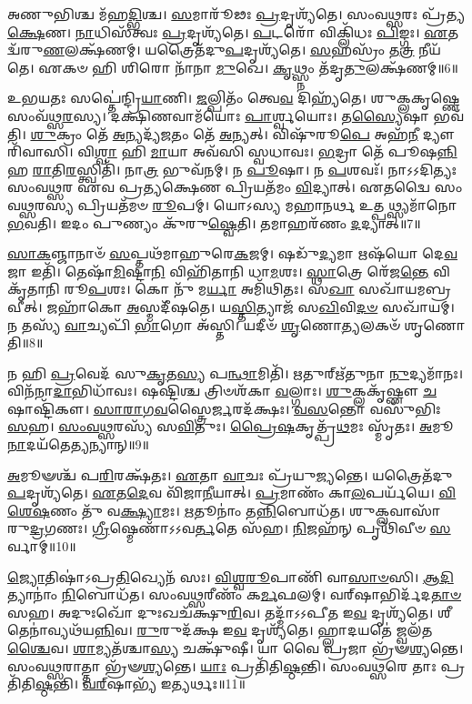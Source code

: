 𑌅𑌣𑍁𑌭𑌿𑌶𑍍𑌚 𑌮᳴𑌹\-\ul{𑌦𑍍𑌭𑌿}\-𑌶𑍍𑌚। \ul{𑌸}\-𑌮𑌾𑌰𑍂᳴𑌢𑌃 \ul{𑌪𑍍𑌰}\-𑌦𑍃𑌶𑍍𑌯᳴𑌤𑍇। 
𑌸𑌂𑌵𑌥𑍍𑌸𑌰𑌃 𑌪𑍍𑌰᳴𑌤𑍍𑌯\-\ul{𑌕𑍍𑌷𑍇}\-𑌣। \ul{𑌨𑌾}\-𑌧𑌿𑌸᳴𑌤𑍍𑌵𑌃 \ul{𑌪𑍍𑌰}\-𑌦𑍃𑌶𑍍𑌯᳴𑌤𑍇। 
\-\ul{𑌪}\-𑌟𑌰𑍋᳴ 𑌵𑌿𑌕𑍍𑌲𑌿᳴𑌧𑌃 \ul{𑌪𑌿}\-𑌙𑍍𑌗𑌃। \ul{𑌏}\-𑌤𑌦𑍍𑌵᳴𑌰𑍁\-\ul{𑌣}\-𑌲𑌕𑍍𑌷᳴𑌣𑌮𑍍। 
𑌯𑌤𑍍𑌰𑍈𑌤᳴𑌦𑍁\-\ul{𑌪}\-𑌦𑍃𑌶𑍍𑌯᳴𑌤𑍇। \ul{𑌸}\-𑌹𑌸𑍍𑌰𑌂᳴ 𑌤\-\ul{𑌤𑍍𑌰} 𑌨𑍀𑌯᳴𑌤𑍇। 
𑌏𑌕𑍞 𑌹𑌿 𑌶𑌿𑌰𑍋 𑌨𑌾᳴𑌨𑌾 \ul{𑌮𑍁}\-𑌖𑍇। \ul{𑌕𑍃}\-𑌥𑍍𑌸𑍍𑌨𑌂 𑌤᳴𑌦𑍃\-\ul{𑌤𑍁}\-𑌲𑌕𑍍𑌷᳴𑌣𑌮𑍍॥6॥

𑌉𑌭𑌯𑌤𑌃 𑌸𑌪𑍍𑌤𑍇॑𑌨𑍍𑌦𑍍𑌰𑌿\-\ul{𑌯𑌾}\-𑌣𑌿। \ul{𑌜}\-𑌲𑍍𑌪𑌿𑌤𑌂᳴ 𑌤𑍍𑌵𑍇\-\ul{𑌵} 𑌦𑌿𑌹𑍍𑌯᳴𑌤𑍇। 
𑌶𑍁𑌕𑍍𑌲𑌕𑍃𑌷𑍍𑌣𑍇 𑌸𑌂𑌵᳴𑌥𑍍𑌸\-\ul{𑌰}\-𑌸𑍍𑌯। 𑌦𑌕𑍍𑌷𑌿𑌣𑌵𑌾𑌮᳴𑌯𑍋𑌃 \ul{𑌪𑌾}\-𑌰𑍍𑌶𑍍𑌵𑌯𑍋𑌃। 
𑌤\-\ul{𑌸𑍍𑌯𑍈}\-𑌷𑌾 𑌭𑌵᳴𑌤𑌿। \ul{𑌶𑍁}\-𑌕𑍍𑌰𑌂 𑌤𑍇᳴ \ul{𑌅}\-𑌨𑍍𑌯𑌦𑍍𑌯᳴\-\ul{𑌜}\-𑌤𑌂 𑌤𑍇᳴ \ul{𑌅}\-𑌨𑍍𑌯𑌤𑍍। 
𑌵𑌿𑌷𑍁᳴𑌰𑍂\-\ul{𑌪𑍇} 𑌅𑌹᳴\-\ul{𑌨𑍀} 𑌦𑍍𑌯𑍗𑌰𑌿᳴𑌵𑌾𑌸𑌿। 𑌵𑌿\-\ul{𑌶𑍍𑌵𑌾} 𑌹𑌿 \ul{𑌮𑌾}\-𑌯𑌾 𑌅𑌵᳴𑌸𑌿 𑌸𑍍𑌵𑌧𑌾𑌵𑌃। 
\-\ul{𑌭}\-𑌦𑍍𑌰𑌾 𑌤𑍇᳴ 𑌪𑍂𑌷\-\ul{𑌨𑍍𑌨𑌿}\-𑌹 \ul{𑌰𑌾}\-𑌤𑌿\-\ul{𑌰}\-𑌸𑍍𑌤𑍍𑌵𑌿𑌤𑌿᳴। 𑌨𑌾\-\ul{𑌤𑍍𑌰} 𑌭𑍁𑌵᳴𑌨𑌮𑍍। 𑌨 \ul{𑌪𑍂}\-𑌷𑌾। 
𑌨 \ul{𑌪}\-𑌶𑌵𑌃᳴। 𑌨𑌾𑌽𑌽𑌦𑌿𑌤𑍍𑌯𑌃 𑌸𑌂𑌵𑌥𑍍𑌸𑌰 𑌏𑌵 𑌪𑍍𑌰𑌤𑍍𑌯𑌕𑍍𑌷𑍇𑌣 𑌪𑍍𑌰𑌿𑌯𑌤᳴𑌮𑌂 \ul{𑌵𑌿}\-𑌦𑍍𑌯𑌾𑌤𑍍। 
𑌏𑌤𑌦𑍍𑌵𑍈 𑌸𑌂𑌵𑌥𑍍𑌸𑌰𑌸𑍍𑌯 𑌪𑍍𑌰𑌿𑌯𑌤᳴𑌮𑍞 \ul{𑌰𑍂}\-𑌪𑌮𑍍। 𑌯𑍋𑌽𑌸𑍍𑌯 𑌮𑌹𑌾𑌨𑌰𑍍𑌥 𑌉𑌤𑍍𑌪𑌥𑍍𑌸𑍍𑌯𑌮𑌾᳴𑌨𑍋 \ul{𑌭}\-𑌵𑌤𑌿। 
𑌇𑌦𑌂 𑌪𑍁𑌣𑍍𑌯𑌂 𑌕𑍁᳴𑌰𑍁\-\ul{𑌷𑍍𑌵𑍇}\-𑌤𑌿। 𑌤𑌮𑌾𑌹𑌰᳴𑌣𑌂 \ul{𑌦}\-𑌦𑍍𑌯𑌾𑌤𑍍॥7॥\anuvakamend


\-\ul{𑌸𑌾}\-\-\ul{𑌕}\-𑌞𑍍𑌜𑌾𑌨𑌾𑍞᳴ \ul{𑌸}\-𑌪𑍍𑌤𑌥᳴𑌮𑌾𑌹𑍁𑌰𑍇\-\ul{𑌕}\-𑌜𑌮𑍍। 𑌷𑌡𑍁᳴\-\ul{𑌦𑍍𑌯}\-𑌮𑌾 𑌋𑌷᳴𑌯𑍋 𑌦𑍇\-\ul{𑌵}\-𑌜𑌾 𑌇𑌤𑌿᳴। 
𑌤𑍇𑌷𑌾᳴\-\ul{𑌮𑌿}\-𑌷𑍍𑌟𑌾\-\ul{𑌨𑌿} 𑌵𑌿𑌹𑌿᳴𑌤𑌾𑌨𑌿 𑌧𑌾\-\ul{𑌮}\-𑌶𑌃। \ul{𑌸𑍍𑌥𑌾}\-𑌤𑍍𑌰𑍇 𑌰𑍇᳴𑌜\-\ul{𑌨𑍍𑌤𑍇} 𑌵𑌿𑌕𑍃᳴𑌤𑌾𑌨𑌿 𑌰𑍂\-\ul{𑌪}\-𑌶𑌃। 
𑌕𑍋 𑌨𑍁᳴ 𑌮\-\ul{𑌰𑍍𑌯𑌾} 𑌅𑌮𑌿᳴𑌥𑌿𑌤𑌃। 𑌸\-\ul{𑌖𑌾} 𑌸𑌖𑌾᳴𑌯𑌮𑌬𑍍𑌰𑌵𑍀𑌤𑍍। 
𑌜𑌹𑌾᳴𑌕𑍋 \ul{𑌅}\-𑌸𑍍𑌮𑌦𑍀᳴𑌷𑌤𑍇। 𑌯\-\ul{𑌸𑍍𑌤𑌿}\-𑌤𑍍𑌯𑌾𑌜᳴ 𑌸\-\ul{𑌖𑌿}\-𑌵𑌿\-\ul{𑌦}\-\-\ul{𑍞} 𑌸𑌖𑌾᳴𑌯𑌮𑍍। 
𑌨 𑌤𑌸𑍍𑌯᳴ \ul{𑌵𑌾}\-𑌚𑍍𑌯𑌪𑌿᳴ \ul{𑌭𑌾}\-𑌗𑍋 𑌅᳴𑌸𑍍𑌤𑌿। 𑌯𑌦𑍀𑍞᳴ \ul{𑌶𑍃}\-𑌣𑍋\-\ul{𑌤𑍍𑌯}\-𑌲𑌕𑍞᳴ 𑌶𑍃𑌣𑍋𑌤𑌿॥8॥

𑌨 𑌹𑌿 \ul{𑌪𑍍𑌰}\-𑌵𑍇𑌦᳴ 𑌸𑍁\-\ul{𑌕𑍃}\-𑌤\-\ul{𑌸𑍍𑌯} 𑌪\-\ul{𑌨𑍍𑌥𑌾}\-𑌮𑌿𑌤𑌿᳴। \ul{𑌋}\-𑌤𑍁𑌰𑍍‌𑌋᳴𑌤𑍁𑌨𑌾 \ul{𑌨𑍁}\-𑌦𑍍𑌯𑌮𑌾᳴𑌨𑌃। 
𑌵𑌿𑌨᳴𑌨𑌾\-\ul{𑌦𑌾}\-𑌭𑌿𑌧𑌾᳴𑌵𑌃। 𑌷𑌷𑍍𑌟𑌿𑌶𑍍𑌚 𑌤𑍍𑌰𑌿𑍞𑌶᳴𑌕𑌾 \ul{𑌵}\-𑌲𑍍𑌗𑌾𑌃। 
\-\ul{𑌶𑍁}\-𑌕𑍍𑌲𑌕𑍃᳴𑌷𑍍𑌣𑍗 \ul{𑌚} 𑌷𑌾𑌷𑍍𑌟𑌿᳴𑌕𑍗। \ul{𑌸𑌾}\-\-\ul{𑌰𑌾}\-\-\ul{𑌗}\-\-\ul{𑌵}\-𑌸𑍍𑌤𑍍𑌰𑍈\-\ul{𑌰𑍍𑌜}\-𑌰𑌦᳴𑌕𑍍𑌷𑌃। 
\-\ul{𑌵}\-\-\ul{𑌸}\-𑌨𑍍𑌤𑍋 𑌵𑌸𑍁᳴𑌭𑌿𑌃 \ul{𑌸}\-𑌹। \ul{𑌸𑌂}\-\-\ul{𑌵}\-\-\ul{𑌥𑍍𑌸}\-𑌰𑌸𑍍𑌯᳴ 𑌸\-\ul{𑌵𑌿}\-𑌤𑍁𑌃। 
\-\ul{𑌪𑍍𑌰𑍈}\-\-\ul{𑌷}\-𑌕𑍃𑌤𑍍𑌪𑍍𑌰᳴\-\ul{𑌥}\-𑌮𑌃 𑌸𑍍𑌮𑍃᳴𑌤𑌃। \ul{𑌅}\-𑌮𑍂\-\ul{𑌨𑌾}\-𑌦𑌯᳴𑌤𑍇\-\ul{𑌤𑍍𑌯}\-𑌨𑍍𑌯𑌾𑌨𑍍॥9॥

\-\ul{𑌅}\-𑌮𑍂𑍟𑌶𑍍𑌚᳴ 𑌪\-\ul{𑌰𑌿}\-𑌰𑌕𑍍𑌷᳴𑌤𑌃। \ul{𑌏}\-𑌤𑌾 \ul{𑌵𑌾}\-𑌚𑌃 𑌪𑍍𑌰᳴𑌯𑍁\-\ul{𑌜𑍍𑌯}\-𑌨𑍍𑌤𑍇। 
𑌯𑌤𑍍𑌰𑍈𑌤᳴𑌦𑍁\-\ul{𑌪}\-𑌦𑍃𑌶𑍍𑌯᳴𑌤𑍇। \ul{𑌏}\-𑌤\-\ul{𑌦𑍇}\-𑌵 𑌵𑌿᳴𑌜𑌾\-\ul{𑌨𑍀}\-𑌯𑌾𑌤𑍍। 
\-\ul{𑌪𑍍𑌰}\-𑌮𑌾𑌣𑌂᳴ 𑌕𑌾\-\ul{𑌲}\-𑌪𑌰𑍍𑌯᳴𑌯𑍇। \ul{𑌵𑌿}\-\-\ul{𑌶𑍇}\-\-\ul{𑌷}\-𑌣𑌂 𑌤𑍁᳴ 𑌵\-\ul{𑌕𑍍𑌷𑍍𑌯𑌾}\-𑌮𑌃। 
\-\ul{𑌋}\-𑌤𑍂𑌨𑌾𑌂॑ 𑌤\-\ul{𑌨𑍍𑌨𑌿}\-𑌬𑍋𑌧᳴𑌤। 𑌶𑍁𑌕𑍍𑌲𑌵𑌾𑌸𑌾᳴ 𑌰𑍁\-\ul{𑌦𑍍𑌰}\-𑌗𑌣𑌃। 
\-\ul{𑌗𑍍𑌰𑍀}\-𑌷𑍍𑌮𑍇𑌣𑌾᳴𑌽𑌽𑌵\-\ul{𑌰𑍍𑌤}\-𑌤𑍇 𑌸᳴𑌹। \ul{𑌨𑌿}\-𑌜𑌹᳴𑌨𑍍‌ 𑌪𑍃𑌥𑌿᳴𑌵𑍀𑍞 \ul{𑌸}\-𑌰𑍍𑌵𑌾𑌮𑍍॥10॥

\-\ul{𑌜𑍍𑌯𑍋}\-𑌤𑌿𑌷𑌾॑𑌽𑌪𑍍𑌰\-\ul{𑌤𑌿}\-𑌖𑍍𑌯𑍇𑌨᳴ 𑌸𑌃। \ul{𑌵𑌿}\-\-\ul{𑌶𑍍𑌵}\-\-\ul{𑌰𑍂}\-𑌪𑌾𑌣𑌿᳴ 𑌵𑌾\-\ul{𑌸𑌾}\-\-\ul{𑍞}\-𑌸𑌿। 
\-\ul{𑌆}\-\-\ul{𑌦𑌿}\-𑌤𑍍𑌯𑌾𑌨𑌾𑌂॑ \ul{𑌨𑌿}\-𑌬𑍋𑌧᳴𑌤। 𑌸𑌂𑌵𑌥𑍍𑌸𑌰𑍀𑌣𑌂᳴ 𑌕\-\ul{𑌰𑍍𑌮}\-𑌫𑌲𑌮𑍍। 
𑌵𑌰𑍍‌𑌷𑌾𑌭𑌿𑌰𑍍𑌦᳴𑌦\-\ul{𑌤𑌾}\-\-\ul{𑍞} 𑌸𑌹। 𑌅𑌦𑍁𑌃𑌖𑍋᳴ 𑌦𑍁𑌃𑌖𑌚᳴𑌕𑍍𑌷𑍁\-\ul{𑌰𑌿}\-𑌵। 
𑌤𑌦𑍍𑌮𑌾᳴𑌽𑌽𑌪𑍀𑌤 𑌇\-\ul{𑌵} 𑌦𑍃𑌶𑍍𑌯᳴𑌤𑍇। 𑌶𑍀𑌤𑍇𑌨𑌾॑𑌵𑍍𑌯𑌥᳴𑌯\-\ul{𑌨𑍍𑌨𑌿}\-𑌵। 
\-\ul{𑌰𑍁}\-𑌰𑍁𑌦᳴𑌕𑍍𑌷 𑌇\-\ul{𑌵} 𑌦𑍃𑌶𑍍𑌯᳴𑌤𑍇। 𑌹𑍍𑌲𑌾𑌦𑌯𑌤𑍇॑ 𑌜𑍍𑌵𑌲᳴𑌤\-\ul{𑌶𑍍𑌚𑍈}\-𑌵। 
\-\ul{𑌶𑌾}\-𑌮𑍍𑌯𑌤᳴𑌶𑍍𑌚𑌾\-\ul{𑌸𑍍𑌯} 𑌚𑌕𑍍𑌷𑍁᳴𑌷𑍀। 𑌯𑌾 𑌵𑍈 𑌪𑍍𑌰𑌜𑌾 𑌭𑍍𑌰᳴𑍟\-\ul{𑌶𑍍𑌯}\-𑌨𑍍𑌤𑍇। 
𑌸𑌂𑌵𑌥𑍍𑌸𑌰𑌾𑌤𑍍𑌤𑌾 𑌭𑍍𑌰᳴𑍟\-\ul{𑌶𑍍𑌯}\-𑌨𑍍𑌤𑍇। \ul{𑌯𑌾𑌃} 𑌪𑍍𑌰𑌤𑌿᳴𑌤𑌿\-\ul{𑌷𑍍𑌠}\-𑌨𑍍𑌤𑌿। 
𑌸𑌂𑌵𑌥𑍍𑌸𑌰𑍇 𑌤𑌾𑌃 𑌪𑍍𑌰𑌤𑌿᳴𑌤𑌿\-\ul{𑌷𑍍𑌠}\-𑌨𑍍𑌤𑌿। \ul{𑌵}\-\ul{𑌰𑍍}‌𑌷𑌾𑌭𑍍𑌯᳴ 𑌇\-\ul{𑌤𑍍𑌯}\-𑌰𑍍𑌥𑌃॥11॥\anuvakamend


